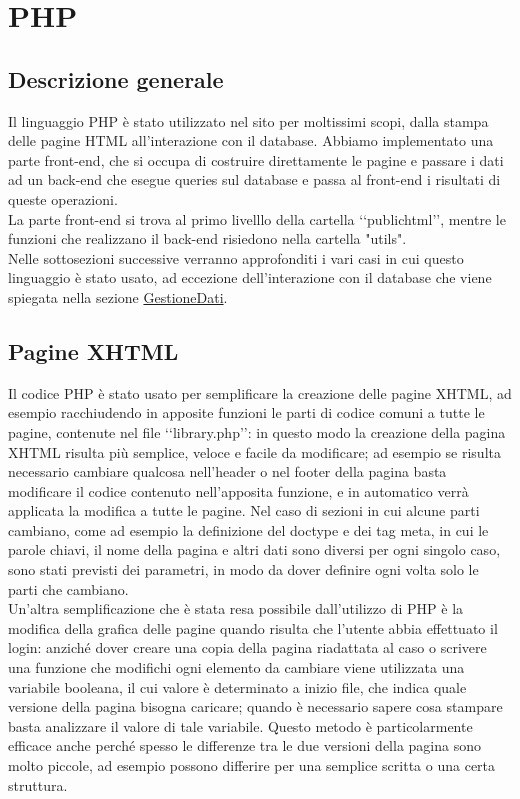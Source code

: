 \section{PHP}{
	\subsection{Descrizione generale}{
		Il linguaggio PHP è stato utilizzato nel sito per moltissimi scopi, dalla stampa delle pagine HTML all'interazione con il database. Abbiamo implementato una parte front-end, che si occupa di costruire direttamente le pagine e passare i dati ad un back-end che esegue queries sul database e passa al front-end i risultati di queste operazioni.\\
		La parte front-end si trova al primo livelllo della cartella ‘‘public\textunderscore html’’, mentre le funzioni che realizzano il back-end risiedono nella cartella "utils".\\
		Nelle sottosezioni successive verranno approfonditi i vari casi in cui questo linguaggio è stato usato, ad eccezione dell'interazione con il database che viene spiegata nella sezione \hyperref[sec:PHPDB]{GestioneDati}.
	}
	\subsection{Pagine XHTML}{
		Il codice PHP è stato usato per semplificare la creazione delle pagine XHTML, ad esempio racchiudendo in apposite funzioni le parti di codice comuni a tutte le pagine, contenute nel file ‘‘library.php’’: in questo modo la creazione della pagina XHTML risulta più semplice, veloce e facile da modificare; ad esempio se risulta necessario cambiare qualcosa nell'header o nel footer della pagina basta modificare il codice contenuto nell'apposita funzione, e in automatico verrà applicata la modifica a tutte le pagine. Nel caso di sezioni in cui alcune parti cambiano, come ad esempio la definizione del doctype e dei tag meta, in cui le parole chiavi, il nome della pagina e altri dati sono diversi per ogni singolo caso, sono stati previsti dei parametri, in modo da dover definire ogni volta solo le parti che cambiano.\\
		Un'altra semplificazione che è stata resa possibile dall'utilizzo di PHP è la modifica della grafica delle pagine quando risulta che l'utente abbia effettuato il login: anziché dover creare una copia della pagina riadattata al caso o scrivere una funzione che modifichi ogni elemento da cambiare viene utilizzata una variabile booleana, il cui valore è determinato a inizio file, che indica quale versione della pagina bisogna caricare; quando è necessario sapere cosa stampare basta analizzare il valore di tale variabile. Questo metodo è particolarmente efficace anche perché spesso le differenze tra le due versioni della pagina sono molto piccole, ad esempio possono differire per una semplice scritta o una certa struttura.
	}
}
